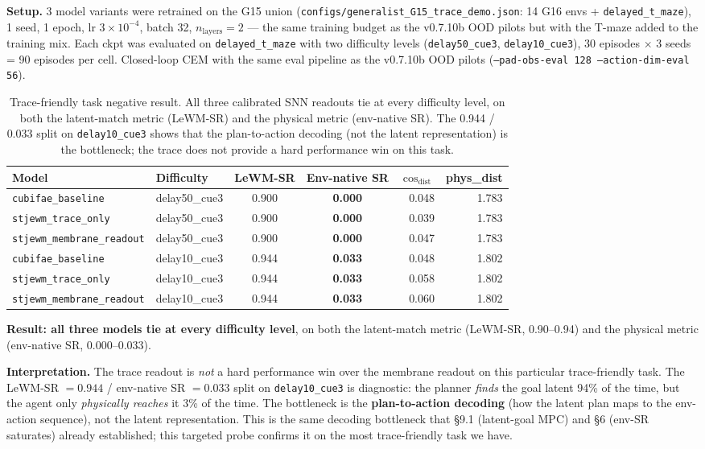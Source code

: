 \documentclass{article}
\begin{document}
\textbf{Setup.} 3 model variants were retrained on the G15 union
(\texttt{configs/generalist\_G15\_trace\_demo.json}: 14 G16 envs +
\texttt{delayed\_t\_maze}), 1 seed, 1 epoch, lr $3 \times 10^{-4}$, batch 32,
$n_{\text{layers}}=2$ --- the same training budget as the v0.7.10b OOD
pilots but with the T-maze added to the training mix. Each ckpt was
evaluated on \texttt{delayed\_t\_maze} with two difficulty levels
(\texttt{delay50\_cue3}, \texttt{delay10\_cue3}), 30 episodes $\times$ 3
seeds = 90 episodes per cell. Closed-loop CEM with the same eval
pipeline as the v0.7.10b OOD pilots
(\texttt{--pad-obs-eval 128 --action-dim-eval 56}).

\begin{table}[ht]
\centering\small
\begin{tabular}{llccrr}
\toprule
Model & Difficulty & LeWM-SR & \textbf{Env-native SR} & $\cos_{\text{dist}}$ & phys\_dist \\
\midrule
\texttt{cubifae\_baseline}        & delay50\_cue3 & 0.900 & \textbf{0.000} & 0.048 & 1.783 \\
\texttt{stjewm\_trace\_only}       & delay50\_cue3 & 0.900 & \textbf{0.000} & 0.039 & 1.783 \\
\texttt{stjewm\_membrane\_readout} & delay50\_cue3 & 0.900 & \textbf{0.000} & 0.047 & 1.783 \\
\texttt{cubifae\_baseline}        & delay10\_cue3 & 0.944 & \textbf{0.033} & 0.048 & 1.802 \\
\texttt{stjewm\_trace\_only}       & delay10\_cue3 & 0.944 & \textbf{0.033} & 0.058 & 1.802 \\
\texttt{stjewm\_membrane\_readout} & delay10\_cue3 & 0.944 & \textbf{0.033} & 0.060 & 1.802 \\
\bottomrule
\end{tabular}
\caption{Trace-friendly task negative result. All three calibrated
SNN readouts tie at every difficulty level, on both the latent-match
metric (LeWM-SR) and the physical metric (env-native SR). The
0.944 / 0.033 split on \texttt{delay10\_cue3} shows that the
plan-to-action decoding (not the latent representation) is the
bottleneck; the trace does not provide a hard performance win on
this task.}
\label{tab:trace-friendly}
\end{table}

\textbf{Result: all three models tie at every difficulty level}, on
both the latent-match metric (LeWM-SR, 0.90--0.94) and the physical
metric (env-native SR, 0.000--0.033).

\textbf{Interpretation.} The trace readout is \emph{not} a hard
performance win over the membrane readout on this particular
trace-friendly task. The LeWM-SR $= 0.944$ / env-native SR $= 0.033$
split on \texttt{delay10\_cue3} is diagnostic: the planner
\emph{finds} the goal latent 94\% of the time, but the agent only
\emph{physically reaches} it 3\% of the time. The bottleneck is
the \textbf{plan-to-action decoding} (how the latent plan maps to
the env-action sequence), not the latent representation. This is
the same decoding bottleneck that §9.1 (latent-goal MPC) and
§6 (env-SR saturates) already established; this targeted probe
confirms it on the most trace-friendly task we have.
\end{document}
